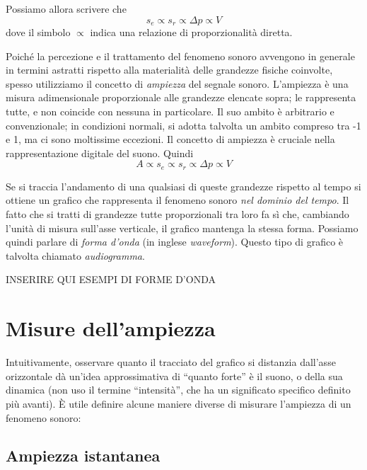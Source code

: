 Possiamo allora scrivere che
\begin{equation}
s_e \propto s_r \propto \Delta p \propto V
\end{equation}
dove il simbolo $\propto$ indica una relazione di proporzionalità diretta.

Poiché la percezione e il trattamento del fenomeno sonoro avvengono in generale in termini astratti rispetto alla materialità delle grandezze fisiche coinvolte, spesso utilizziamo il concetto di \emph{ampiezza} del segnale sonoro. L'ampiezza è una misura adimensionale proporzionale alle grandezze elencate sopra; le rappresenta tutte, e non coincide con nessuna in particolare. Il suo ambito è arbitrario e convenzionale; in condizioni normali, si adotta talvolta un ambito compreso tra -1 e 1, ma ci sono moltissime eccezioni. Il concetto di ampiezza è cruciale nella rappresentazione digitale del suono. Quindi
\begin{equation}
A \propto s_e \propto s_r \propto \Delta p \propto V
\end{equation}

Se si traccia l'andamento di una qualsiasi di queste grandezze rispetto al tempo si ottiene un grafico che rappresenta il fenomeno sonoro \emph{nel dominio del tempo}. Il fatto che si tratti di grandezze tutte proporzionali tra loro fa sì che, cambiando l'unità di misura sull'asse verticale, il grafico mantenga la stessa forma. Possiamo quindi parlare di \emph{forma d'onda} (in inglese \emph{waveform}). Questo tipo di grafico è talvolta chiamato \emph{audiogramma}.



INSERIRE QUI ESEMPI DI FORME D'ONDA

\section{Misure dell'ampiezza}



Intuitivamente, osservare quanto il tracciato del grafico si distanzia dall'asse orizzontale dà un'idea approssimativa di ``quanto forte'' è il suono, o della sua dinamica (non uso il termine ``intensità'', che ha un significato specifico definito più avanti). È utile definire alcune maniere diverse di misurare l'ampiezza di un fenomeno sonoro:

\subsection{Ampiezza istantanea}

